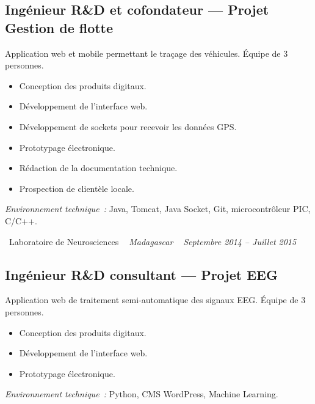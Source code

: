 \documentclass[10pt,a4paper]{article}
\begin{document}
\subsection*{Ingénieur R\&D et cofondateur --- Projet Gestion de flotte}
\color{darkgray}
Application web et mobile permettant le traçage des véhicules. Équipe de 3 personnes.
\begin{itemize}
  \item Conception des produits digitaux.
  \item Développement de l'interface web.
  \item Développement de sockets pour recevoir les données GPS.
  \item Prototypage électronique.
  \item Rédaction de la documentation technique.
  \item Prospection de clientèle locale.
\end{itemize}
\textit{Environnement technique~:} Java, Tomcat, Java Socket, Git, microcontrôleur PIC, C/C++.

\vspace{10pt}

\noindent\textcolor{primary}{ \faBuilding\ Laboratoire de Neurosciences} \quad
\textit{ \small \textcolor{darkgray}{ \faMapMarker\ } Madagascar } \hfill
\textit{ \small \textcolor{darkgray}{ \faCalendar\ } Septembre 2014 -- Juillet 2015 }

\vspace{4pt}

\subsection*{Ingénieur R\&D consultant --- Projet EEG}
\color{darkgray}
Application web de traitement semi-automatique des signaux EEG. Équipe de 3 personnes.
\begin{itemize}
  \item Conception des produits digitaux.
  \item Développement de l'interface web.
  \item Prototypage électronique.
\end{itemize}
\textit{Environnement technique~:} Python, CMS WordPress, Machine Learning.

\vspace{14pt}
\end{document}
